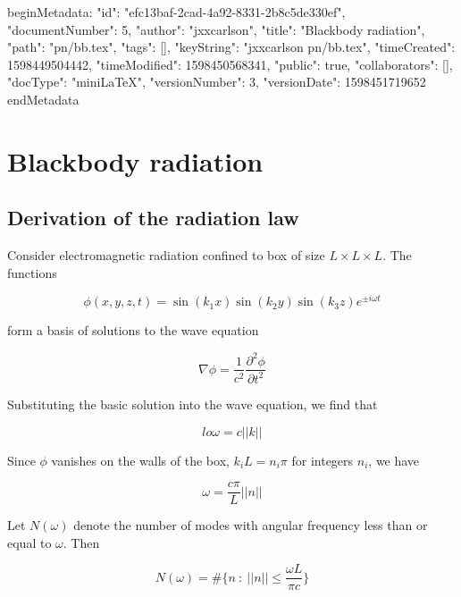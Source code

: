 beginMetadata:
{
    "id": "efc13baf-2cad-4a92-8331-2b8c5de330ef",
    "documentNumber": 5,
    "author": "jxxcarlson",
    "title": "Blackbody radiation",
    "path": "pn/bb.tex",
    "tags": [],
    "keyString": "jxxcarlson pn/bb.tex",
    "timeCreated": 1598449504442,
    "timeModified": 1598450568341,
    "public": true,
    "collaborators": [],
    "docType": "miniLaTeX",
    "versionNumber": 3,
    "versionDate": 1598451719652
}
endMetadata

\setcounter{section}{5}

\section{Blackbody radiation}

\innertableofcontents


\subsection{Derivation of the radiation law}

Consider electromagnetic radiation confined to box of size $L\times L \times L$. The functions

\begin{equation}
\phi(x,y,z,t) = \sin(k_1x)\sin(k_2y)\sin(k_3z)e^{\pm i\omega t}
\end{equation}

form a basis of solutions to the wave equation

\begin{equation}
\nabla \phi = \frac{1}{c^2} \frac{\partial^2 \phi}{\partial t^2}
\end{equation}

Substituting the basic solution into the wave equation, we find that

\begin{equation}lo
\omega = c||k||
\end{equation}

Since $\phi$ vanishes on the walls of the box, $k_iL = n_i\pi$ for
integers $n_i$, we have

\begin{equation}
\omega = \frac{c\pi}{L} ||n||
\end{equation}

Let $N(\omega)$ denote the number of modes with angular frequency less than or equal to $\omega$.  Then


\begin{equation}
N(\omega) = \#\Big\{ n\ :\ ||n|| \le \frac{\omega L}{\pi c} \Big\}
\end{equation}



